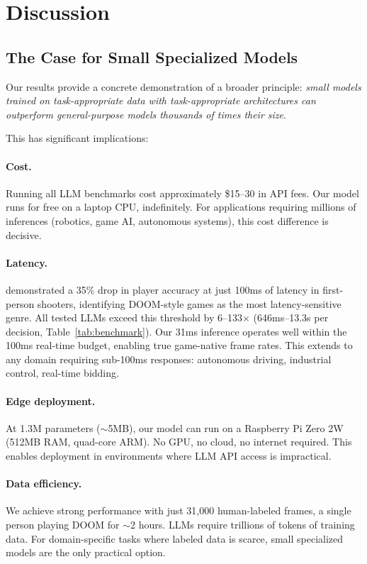 \documentclass[11pt,a4paper]{article}
\begin{document}
\section{Discussion}
\label{sec:discussion}

\subsection{The Case for Small Specialized Models}

Our results provide a concrete demonstration of a broader principle: \textit{small models trained on task-appropriate data with task-appropriate architectures can outperform general-purpose models thousands of times their size}.

This has significant implications:

\paragraph{Cost.} Running all LLM benchmarks cost approximately \$15--30 in API fees. Our model runs for free on a laptop CPU, indefinitely. For applications requiring millions of inferences (robotics, game AI, autonomous systems), this cost difference is decisive.

\paragraph{Latency.} \citet{claypool2006latency} demonstrated a 35\% drop in player accuracy at just 100ms of latency in first-person shooters, identifying DOOM-style games as the most latency-sensitive genre. All tested LLMs exceed this threshold by 6--133$\times$ (646ms--13.3s per decision, Table~\ref{tab:benchmark}). Our 31ms inference operates well within the 100ms real-time budget, enabling true game-native frame rates. This extends to any domain requiring sub-100ms responses: autonomous driving, industrial control, real-time bidding.

\paragraph{Edge deployment.} At 1.3M parameters (${\sim}$5MB), our model can run on a Raspberry Pi Zero 2W (512MB RAM, quad-core ARM). No GPU, no cloud, no internet required. This enables deployment in environments where LLM API access is impractical.

\paragraph{Data efficiency.} We achieve strong performance with just 31,000 human-labeled frames, a single person playing DOOM for ${\sim}$2 hours. LLMs require trillions of tokens of training data. For domain-specific tasks where labeled data is scarce, small specialized models are the only practical option.
\end{document}
